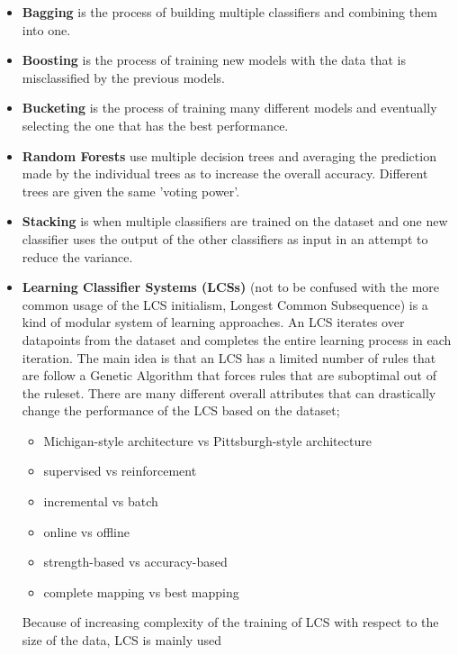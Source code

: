 \begin{itemize}
	\item \textbf{Bagging}
		is the process of building multiple classifiers and combining them into one.
	\item \textbf{Boosting}
		is the process of training new models with the data that is misclassified by the previous models.
	\item \textbf{Bucketing}
		is the process of training many different models and eventually selecting the one that has the best performance.
	\item \textbf{Random Forests}\cite{Breiman2001}
		use multiple decision trees and averaging the prediction made by the individual trees as to increase the overall accuracy. Different trees are given the same 'voting power'.
	\item \textbf{Stacking}
		is when multiple classifiers are trained on the dataset and one new classifier uses the output of the other classifiers as input in an attempt to reduce the variance.
	\item \textbf{Learning Classifier Systems (LCSs)}
		(not to be confused with the more common usage of the LCS initialism, Longest Common Subsequence) is a kind of modular system of learning approaches. An LCS iterates over datapoints from the dataset and completes the entire learning process in each iteration. The main idea is that an LCS has a limited number of rules that are follow a Genetic Algorithm that forces rules that are suboptimal out of the ruleset. There are many different overall attributes that can drastically change the performance of the LCS based on the dataset;
		\begin{itemize}
			\item Michigan-style architecture vs Pittsburgh-style architecture
			\item supervised vs reinforcement
			\item incremental vs batch
			\item online vs offline
			\item strength-based vs accuracy-based
			\item complete mapping vs best mapping
		\end{itemize}
		Because of increasing complexity of the training of LCS with respect to the size of the data, LCS is mainly used 
\end{itemize}


%
%


